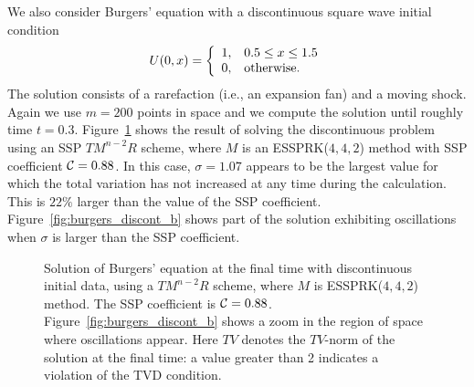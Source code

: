 We also consider Burgers' equation with a discontinuous
square wave initial condition
\begin{align*}%
    U(0,x)  = \left\{
                \begin{array}{ll}
                  1, & \hbox{$0.5 \leq x \leq 1.5$} \\
                  0, & \hbox{otherwise.}
                \end{array}
              \right.
\end{align*}
The solution consists of a rarefaction (i.e., an expansion fan) and a
moving shock.
Again we use $m = 200$ points in space and we compute the solution until
roughly time $t = 0.3$.
Figure~\ref{fig:burgers_discont} shows the result of solving the
discontinuous problem using an SSP $TM^{n-2}R$ scheme, where $M$ is an
ESSPRK($4,4,2$) method with SSP coefficient $\mathcal{C} = 0.88$.
In this case, $\sigma = 1.07$ appears to be the largest value
for which the total variation has not increased at any time
during the calculation.
This is $22\%$ larger than the value of the SSP coefficient.
Figure~\ref{fig:burgers_discont_b} shows part of the solution exhibiting 
oscillations when $\sigma$ is %
larger than the SSP coefficient.



\begin{figure}
    \centering
    \caption{Solution of Burgers' equation at the final time with discontinuous initial data, using a
    $TM^{n-2}R$ scheme, where $M$ is ESSPRK($4,4,2$) method. 
    The SSP coefficient is $ \mathcal{C} = 0.88$. 
    Figure~\ref{fig:burgers_discont_b} shows a zoom in the region of space where
    oscillations appear.
    Here $TV$ denotes the $TV$-norm of the solution at the final time:
    a value greater than 2 indicates a violation of the TVD condition.
    }
    \label{fig:burgers_discont}
\end{figure}

